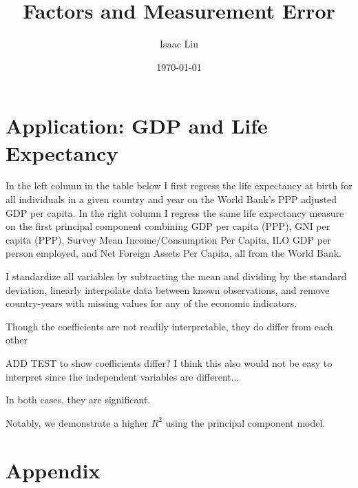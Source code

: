 \documentclass{report}
\title{Factors and Measurement Error}
\author{Isaac Liu}
\date{\today}
\begin{document}
	\maketitle

	\newpage \clearpage

    \section*{Application: GDP and Life Expectancy}

	In the left column in the table below I first regress the life expectancy at birth for all individuals in a given country and year on the World Bank's PPP adjusted GDP per capita. In the right column I regress the same life expectancy measure on the first principal component combining GDP per capita (PPP), GNI per capita (PPP), Survey Mean Income/Consumption Per Capita, ILO GDP per person employed, and Net Foreign Assets Per Capita, all from the World Bank.
	
	I standardize all variables by subtracting the mean and dividing by the standard deviation, linearly interpolate data between known observations, and remove country-years with missing values for any of the economic indicators.

    

	Though the coefficients are not readily interpretable, they do differ from each other

	ADD TEST to show coefficients differ? I think this also would not be easy to interpret since the independent variables are different...

	In both cases, they are significant.
	
	Notably, we demonstrate a higher $R^2$ using the principal component model.

    \clearpage \newpage

    \appendix

    \section*{Appendix}
\end{document}
